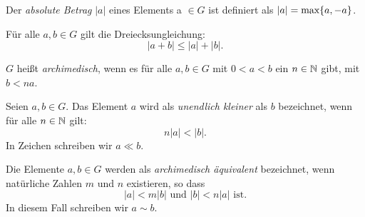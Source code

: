 \begin{defn} \label{betrag}
Der \textit{absolute Betrag} $|a|$ eines Elements a $\in  G$ ist definiert als $|a| = \textup{max}\lbrace a, -a \rbrace$.
\end{defn}

\begin{lemma}
Für alle $a,b \in G$ gilt die Dreiecksungleichung:
\[|a+ b | \le |a| + |b|.\]
\end{lemma}
%
% 
%
%
%
%
%
\begin{defn}\label{archim}
$G$ heißt \textit{archimedisch}, wenn es für alle $a, b \in G$  mit $0 < a < b$ ein $n \in \mathbb{N} $ gibt, mit $b < na$.
\end{defn}
%
%
\begin{defn}\label{uek}
Seien $a, b \in G$. Das Element $a$ wird als \textit{unendlich kleiner} als $b$ bezeichnet, wenn für alle $  n \in \mathbb{N} $ gilt: 
\[n|a| < |b|.\]
In Zeichen schreiben wir $a \ll b$.
\end{defn}
%
\begin{defn}\label{aae}
Die Elemente $a,b \in G$ werden als \textit{archimedisch äquivalent} bezeichnet, wenn natürliche Zahlen $m$ und $n$ existieren, so dass 
\[|a| < m|b| \text{ und } |b| < n|a|\text{ ist}.\]
In diesem Fall schreiben wir $ a \sim b $. 
\end{defn}
%
